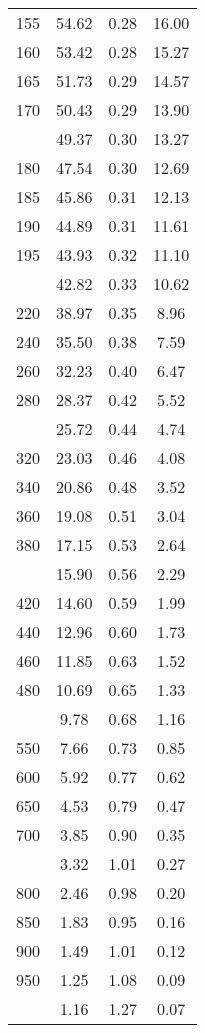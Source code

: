 \begin{table}[ht]
\begin{tabular}{lccc}
  155 & 54.62 & 0.28 & 16.00 \\ 
  160 & 53.42 & 0.28 & 15.27 \\ 
  165 & 51.73 & 0.29 & 14.57 \\ 
  170 & 50.43 & 0.29 & 13.90 \\ 
   \addlinespace
175 & 49.37 & 0.30 & 13.27 \\ 
  180 & 47.54 & 0.30 & 12.69 \\ 
  185 & 45.86 & 0.31 & 12.13 \\ 
  190 & 44.89 & 0.31 & 11.61 \\ 
  195 & 43.93 & 0.32 & 11.10 \\ 
   \addlinespace
200 & 42.82 & 0.33 & 10.62 \\ 
  220 & 38.97 & 0.35 & 8.96 \\ 
  240 & 35.50 & 0.38 & 7.59 \\ 
  260 & 32.23 & 0.40 & 6.47 \\ 
  280 & 28.37 & 0.42 & 5.52 \\ 
   \addlinespace
300 & 25.72 & 0.44 & 4.74 \\ 
  320 & 23.03 & 0.46 & 4.08 \\ 
  340 & 20.86 & 0.48 & 3.52 \\ 
  360 & 19.08 & 0.51 & 3.04 \\ 
  380 & 17.15 & 0.53 & 2.64 \\ 
   \addlinespace
400 & 15.90 & 0.56 & 2.29 \\ 
  420 & 14.60 & 0.59 & 1.99 \\ 
  440 & 12.96 & 0.60 & 1.73 \\ 
  460 & 11.85 & 0.63 & 1.52 \\ 
  480 & 10.69 & 0.65 & 1.33 \\ 
   \addlinespace
500 & 9.78 & 0.68 & 1.16 \\ 
  550 & 7.66 & 0.73 & 0.85 \\ 
  600 & 5.92 & 0.77 & 0.62 \\ 
  650 & 4.53 & 0.79 & 0.47 \\ 
  700 & 3.85 & 0.90 & 0.35 \\ 
   \addlinespace
750 & 3.32 & 1.01 & 0.27 \\ 
  800 & 2.46 & 0.98 & 0.20 \\ 
  850 & 1.83 & 0.95 & 0.16 \\ 
  900 & 1.49 & 1.01 & 0.12 \\ 
  950 & 1.25 & 1.08 & 0.09 \\ 
   \addlinespace
1000 & 1.16 & 1.27 & 0.07 \\ 
   \bottomrule
\end{tabular}
\end{table}
